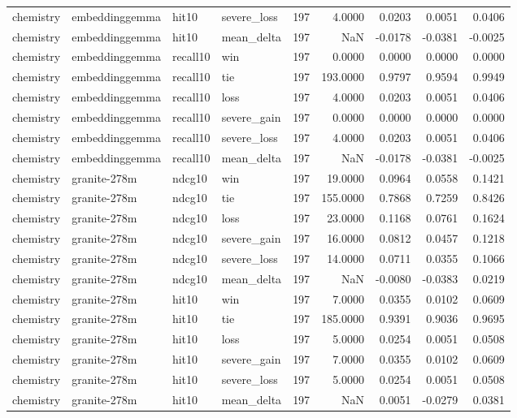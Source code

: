 \begin{tabular}{llllrrrrr}
chemistry & embeddinggemma & hit10 & severe\_loss & 197 & 4.0000 & 0.0203 & 0.0051 & 0.0406 \\
chemistry & embeddinggemma & hit10 & mean\_delta & 197 & NaN & -0.0178 & -0.0381 & -0.0025 \\
chemistry & embeddinggemma & recall10 & win & 197 & 0.0000 & 0.0000 & 0.0000 & 0.0000 \\
chemistry & embeddinggemma & recall10 & tie & 197 & 193.0000 & 0.9797 & 0.9594 & 0.9949 \\
chemistry & embeddinggemma & recall10 & loss & 197 & 4.0000 & 0.0203 & 0.0051 & 0.0406 \\
chemistry & embeddinggemma & recall10 & severe\_gain & 197 & 0.0000 & 0.0000 & 0.0000 & 0.0000 \\
chemistry & embeddinggemma & recall10 & severe\_loss & 197 & 4.0000 & 0.0203 & 0.0051 & 0.0406 \\
chemistry & embeddinggemma & recall10 & mean\_delta & 197 & NaN & -0.0178 & -0.0381 & -0.0025 \\
chemistry & granite-278m & ndcg10 & win & 197 & 19.0000 & 0.0964 & 0.0558 & 0.1421 \\
chemistry & granite-278m & ndcg10 & tie & 197 & 155.0000 & 0.7868 & 0.7259 & 0.8426 \\
chemistry & granite-278m & ndcg10 & loss & 197 & 23.0000 & 0.1168 & 0.0761 & 0.1624 \\
chemistry & granite-278m & ndcg10 & severe\_gain & 197 & 16.0000 & 0.0812 & 0.0457 & 0.1218 \\
chemistry & granite-278m & ndcg10 & severe\_loss & 197 & 14.0000 & 0.0711 & 0.0355 & 0.1066 \\
chemistry & granite-278m & ndcg10 & mean\_delta & 197 & NaN & -0.0080 & -0.0383 & 0.0219 \\
chemistry & granite-278m & hit10 & win & 197 & 7.0000 & 0.0355 & 0.0102 & 0.0609 \\
chemistry & granite-278m & hit10 & tie & 197 & 185.0000 & 0.9391 & 0.9036 & 0.9695 \\
chemistry & granite-278m & hit10 & loss & 197 & 5.0000 & 0.0254 & 0.0051 & 0.0508 \\
chemistry & granite-278m & hit10 & severe\_gain & 197 & 7.0000 & 0.0355 & 0.0102 & 0.0609 \\
chemistry & granite-278m & hit10 & severe\_loss & 197 & 5.0000 & 0.0254 & 0.0051 & 0.0508 \\
chemistry & granite-278m & hit10 & mean\_delta & 197 & NaN & 0.0051 & -0.0279 & 0.0381 \\

\end{tabular}
